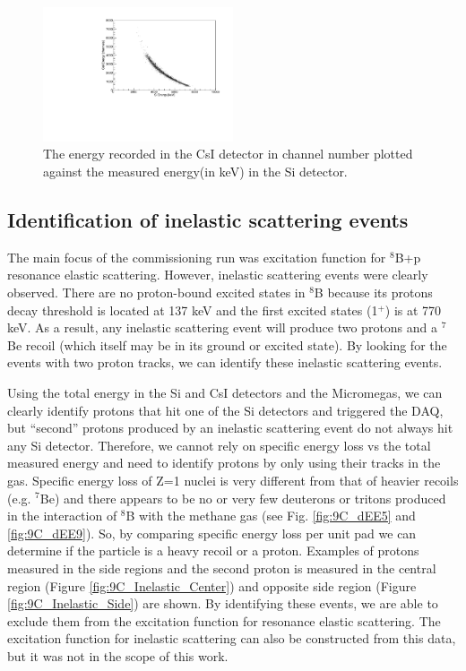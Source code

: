 \documentclass[final,number,sort&compress,5p,times,twocolumn]{elsarticle}
\begin{document}
\begin{figure}[hbt!]
	\centering
    \includegraphics[width=0.5\textwidth]{figures/TexAT_SiECsIE}
    \caption{The energy recorded in the CsI detector in channel number plotted against the measured energy(in keV) in the Si detector.}
    \label{fig:TexAT_SiECsIE}
\end{figure}

\subsection{Identification of inelastic scattering events}

The main focus of the commissioning run was excitation function for $^8$B+p resonance elastic scattering. However, inelastic scattering events were clearly observed. There are no proton-bound excited states in $^8$B because its protons decay threshold is located at 137 keV and the first excited states (1$^+$) is at 770 keV. As a result, any inelastic scattering event will produce two protons and a $^7$Be recoil (which itself may be in its ground or excited state). By looking for the events with two proton tracks, we can identify these inelastic scattering events.

Using the total energy in the Si and CsI detectors and the Micromegas, we can clearly identify protons that hit one of the Si detectors and triggered the DAQ, but ``second'' protons produced by an inelastic scattering event do not always hit any Si detector. Therefore, we cannot rely on specific energy loss vs the total measured energy and need to identify protons by only using their tracks in the gas. Specific energy loss of Z=1 nuclei is very different from that of heavier recoils (e.g. $^7$Be) and there appears to be no or very few deuterons or tritons produced in the interaction of $^8$B with the methane gas (see Fig. \ref{fig:9C_dEE5} and \ref{fig:9C_dEE9}). So, by comparing specific energy loss per unit pad we can determine if the particle is a heavy recoil or a proton. Examples of protons measured in the side regions and the second proton is measured in the central region (Figure \ref{fig:9C_Inelastic_Center}) and opposite side region (Figure \ref{fig:9C_Inelastic_Side}) are shown. By identifying these events, we are able to exclude them from the excitation function for resonance elastic scattering. The excitation function for inelastic scattering can also be constructed from this data, but it was not in the scope of this work.
\end{document}
